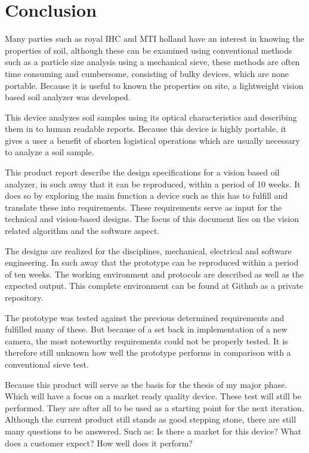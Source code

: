 \documentclass[11pt,fleqn,,a4paper,twoside,openright]{book}
\begin{document}
\chapter{Conclusion}\label{chap:conclusion}
Many parties such as royal IHC and MTI holland have an interest in knowing the properties of soil, although these can be examined using conventional methods such as a particle size analysis using a mechanical sieve, these methods are often time consuming and cumbersome, consisting of bulky devices, which are none portable. Because it is useful to known the properties on site, a lightweight vision based soil analyzer was developed.

This device analyzes soil samples using its optical characteristics and describing them in to human readable reports. Because this device is highly portable, it gives a user a benefit of shorten logistical operations which are usually necessary to analyze a soil sample.

This product report describe the design specifications for a vision based oil analyzer, in such away that it can be reproduced, within a period of 10 weeks. It does so by exploring the main function a device such as this has to fulfill and translate these into requirements. These requirements serve as input for the technical and vision-based designs. The focus of this document lies on the vision related algorithm and the software aspect.

The designs are realized for the disciplines, mechanical, electrical and software engineering. In such away that the prototype can be reproduced within a period of ten weeks. The working environment and protocols are described as well as the expected output. This complete environment can be found at Github as a private repository.

The prototype was tested against the previous determined requirements and fulfilled many of these. But because of a set back in implementation of a new camera, the most noteworthy requirements could not be properly tested. It is therefore still unknown how well the prototype performs in comparison with a conventional sieve test.

Because this product will serve as the basis for the thesis of my major phase. Which will have a focus on a market ready quality device. These test will still be performed. They are after all to be used as a starting point for the next iteration. Although the current product still stands as good stepping stone, there are still many questions to be answered. Such as: Is there a market for this device? What does a customer expect? How well does it perform?
\end{document}
